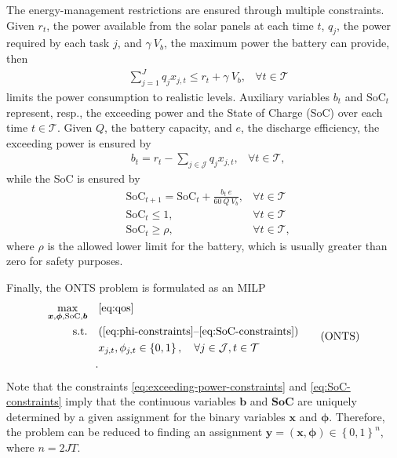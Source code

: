 The energy-management restrictions are ensured through multiple constraints.
Given $r_t$, the power available from the solar panels at each time $t$, $q_j$, the power required by each task $j$, and $\gamma~V_{b}$, the maximum power the battery can provide, then
\begin{equation}\label{eq:power-consumption-constraints}
    \begin{aligned}
	&\sum_{j=1}^{J} q_{j} x_{j,t} \leq r_t + \gamma~V_{b}, & \forall t\in\mathcal{T}
    \end{aligned}
\end{equation}
limits the power consumption to realistic levels.
Auxiliary variables $b_t$ and $\text{SoC}_t$ represent, resp., the exceeding power and the State of Charge (SoC) over each time $t\in \mathcal{T}$.
Given $Q$, the battery capacity, and $e$, the discharge efficiency, the exceeding power is ensured by
\begin{equation}\label{eq:exceeding-power-constraints}
    \begin{aligned}
	& b_{t} = r_{t} - \sum_{j \in \mathcal{J}} q_{j} x_{j,t}, &  \forall t \in \mathcal{T}
    ,\end{aligned}
\end{equation}
while the SoC is ensured by
\begin{equation}\label{eq:SoC-constraints}
    \begin{aligned}
    &\text{SoC}_{t+1} = \text{SoC}_{t} + \frac{b_{t}~e}{60~Q~V_{b}}, & \forall t \in \mathcal{T}  \\
    &\text{SoC}_{t} \leq 1, & \forall t\in\mathcal{T}    \\
    &\text{SoC}_{t} \geq \rho, & \forall t\in\mathcal{T}
    ,\end{aligned}
\end{equation}
where $\rho$ is the allowed lower limit for the battery, which is usually greater than zero for safety purposes.

Finally, the ONTS problem is formulated as an MILP
\begin{equation}\label{eq:onts-milp}
\begin{aligned}
    \max_{\bm{x},\bm{\phi},\bm{\text{SoC}},\bm{b}} \quad & \eqref{eq:qos} \\
    \textrm{s.t.} \quad & (\ref{eq:phi-constraints} \text{--} \ref{eq:SoC-constraints}) \\
	    & x_{j,t}, \phi_{j,t} \in \left\{ 0,1 \right\} ,\quad \forall j\in \mathcal{J}, t\in \mathcal{T} \\
.\end{aligned} \tag{ONTS}
\end{equation}
Note that the constraints \eqref{eq:exceeding-power-constraints} and \eqref{eq:SoC-constraints} imply that the continuous variables $\bm{b}$ and $\bm{\text{SoC}}$ are uniquely determined by a given assignment for the binary variables $\bm{x}$ and $\bm{\phi}$.
Therefore, the problem can be reduced to finding an assignment $\bm{y}=(\bm{x},\bm{\phi}) \in \left\{ 0,1 \right\}^{n}$, where $n=2JT$.

